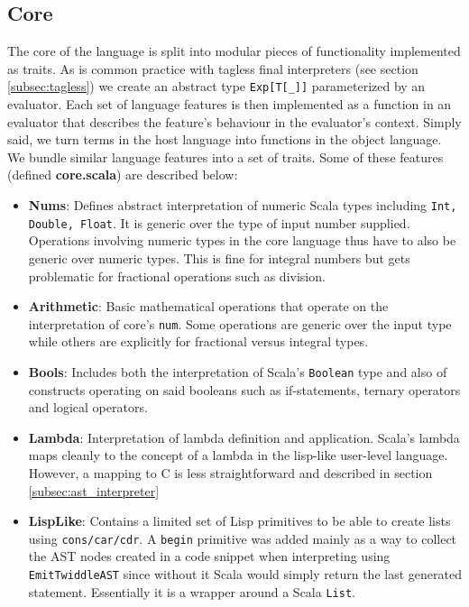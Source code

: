 \documentclass{article}
\begin{document}
\subsection{Core}
The core of the language is split into modular pieces of functionality implemented as traits. As is common practice with tagless final interpreters (see section \ref{subsec:tagless}) we create an abstract type \texttt{Exp[T[\_]]} parameterized by an evaluator. Each set of language features is then implemented as a function in an evaluator that describes the feature's behaviour in the evaluator's context. Simply said, we turn terms in the host language into functions in the object language. We bundle similar language features into a set of traits. Some of these features (defined \textbf{core.scala}) are described below:
\begin{itemize}
	\item \textbf{Nums}: Defines abstract interpretation of numeric Scala types including \texttt{Int, Double, Float}. It is generic over the type of input number supplied. Operations involving numeric types in the core language thus have to also be generic over numeric types. This is fine for integral numbers but gets problematic for fractional operations such as division.
	\item \textbf{Arithmetic}: Basic mathematical operations that operate on the interpretation of core's \texttt{num}. Some operations are generic over the input type while others are explicitly for fractional versus integral types.
	\item \textbf{Bools}: Includes both the interpretation of Scala's \texttt{Boolean} type and also of constructs operating on said booleans such as if-statements, ternary operators and logical operators.
	\item \textbf{Lambda}: Interpretation of lambda definition and application. Scala's lambda maps cleanly to the concept of a lambda in the lisp-like user-level language. However, a mapping to C is less straightforward and described in section \ref{subsec:ast_interpreter}
	\item \textbf{LispLike}: Contains a limited set of Lisp primitives to be able to create lists using \texttt{cons/car/cdr}. A \texttt{begin} primitive was added mainly as a way to collect the AST nodes created in a code snippet when interpreting using \texttt{EmitTwiddleAST} since without it Scala would simply return the last generated statement. Essentially it is a wrapper around a Scala \texttt{List}.
\end{itemize}
\end{document}

